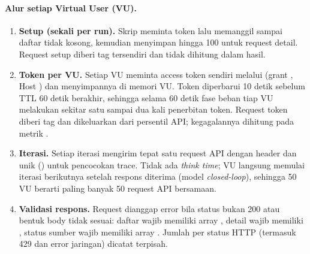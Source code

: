 \paragraph{Alur setiap Virtual User (VU).}
\begin{enumerate}
    \item \textbf{Setup (sekali per run).} Skrip meminta token lalu memanggil
     sampai daftar tidak kosong, kemudian
    menyimpan hingga 100  untuk request detail. Request setup diberi
    tag tersendiri dan tidak dihitung dalam hasil.
    \item \textbf{Token per VU.} Setiap VU meminta access token sendiri melalui
     (grant , Host
    ) dan menyimpannya di memori VU. Token diperbarui
    10 detik sebelum TTL 60 detik berakhir, sehingga selama 60 detik fase beban
    tiap VU melakukan sekitar satu sampai dua kali penerbitan token. Request token
    diberi tag  dan dikeluarkan dari persentil API; kegagalannya
    dihitung pada metrik .
    \item \textbf{Iterasi.} Setiap iterasi mengirim tepat satu request API dengan
    header  dan  unik
    () untuk pencocokan trace. Tidak ada \emph{think time};
    VU langsung memulai iterasi berikutnya setelah respons diterima (model
    \emph{closed-loop}), sehingga 50 VU berarti paling banyak 50 request API
    bersamaan.
    \item \textbf{Validasi respons.} Request dianggap error bila status bukan 200
    atau bentuk body tidak sesuai: daftar wajib memiliki array ,
    detail wajib memiliki , status sumber wajib memiliki
    array . Jumlah per status HTTP (termasuk 429 dan error
    jaringan) dicatat terpisah.
\end{enumerate}

